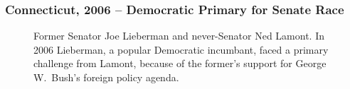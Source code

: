 \documentclass[handout]{beamer}
\begin{document}
\begin{frame}
\frametitle{Connecticut, 2006 -- Democratic Primary for Senate Race}


\begin{figure}
	\hspace{1em}
	\caption{Former Senator Joe Lieberman and never-Senator  Ned Lamont. In 2006 Lieberman, a popular Democratic incumbant, faced a primary challenge from Lamont, because of the former's support for George W.\ Bush's foreign policy agenda.}
\end{figure}

\end{frame}
\end{document}
